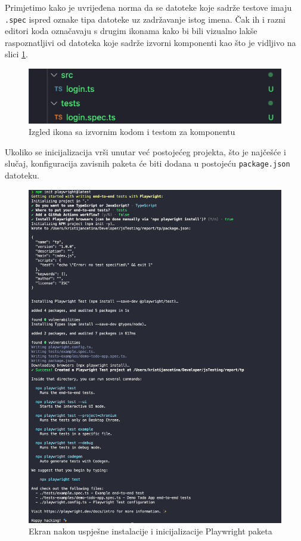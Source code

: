 Primjetimo kako je uvrijeđena norma da se datoteke koje sadrže testove imaju \texttt{.spec} ispred oznake tipa datoteke uz zadržavanje istog imena. Čak ih i razni editori koda označavaju s drugim ikonama kako bi bili vizualno lakše raspoznatljivi od datoteka koje sadrže izvorni komponenti kao što je vidljivo na slici \ref{img:filesLogos}.
\begin{figure}[!h]\begin{center}
    \includegraphics[width=1\textwidth]{"img/filesLogos"}
    \caption{Izgled ikona sa izvornim kodom i testom za komponentu}\label{img:filesLogos}
\end{center}\end{figure}

Ukoliko se inicijalizacija vrši unutar već postojećeg projekta, što je najčešće i slučaj, konfiguracija zavisnih paketa će biti dodana u postojeću \texttt{package.json} datoteku.

\begin{figure}[!h]\begin{center}
    \includegraphics[width=1\textwidth]{"img/pwInit"}
    \caption{Ekran nakon uspješne instalacije i inicijalizacije Playwright paketa}\label{img:pwInit}
\end{center}\end{figure}

